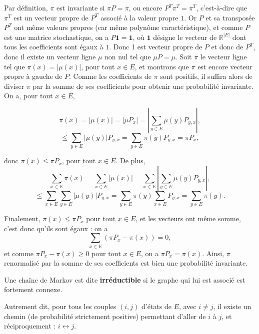 \documentclass{article}
\begin{document}
\begin{tcolorbox}[colback=white,colframe=green!80!black,title=Démonstration]
Par définition, $\pi$ est invariante si $\pi P = \pi$, ou encore $P^T \pi^T = \pi^T$, c'est-à-dire que $\pi^T$ est un vecteur propre de $P^T$ associé à la valeur propre $1$.
Or $P$ et sa transposée $P^T$ ont même valeurs propres (car même polynôme caractéristique), et comme $P$ est une matrice stochastique, on a $P \mathbf{1} = \mathbf{1}$, où $\mathbf{1}$ désigne le vecteur de $\mathbb{R}^{|E|}$ dont tous les coefficients sont égaux à $1$.
Donc 1 est vecteur propre de $P$ et donc de $P^T$, donc il existe un vecteur ligne $\mu$ non nul tel que $\mu P = \mu$. Soit $\pi$ le vecteur ligne tel que $\pi(x) = |\mu(x)|$, pour tout $x \in E$, et montrons que $\pi$ est encore vecteur propre à gauche de $P$.
Comme les coefficients de $\pi$ sont positifs, il suffira alors de diviser $\pi$ par la somme de ses coefficients pour obtenir une probabilité invariante. On a, pour tout $x \in E$,

\end{tcolorbox} \begin{tcolorbox}[colback=white,colframe=green!80!black,title=Démonstration] %

\[
\pi(x) = |\mu(x)| = |\mu P_x| = \left| \sum_{y \in E} \mu(y) P_{y,x} \right|,
\]
\[
\leq \sum_{y \in E} |\mu(y)| P_{y,x} = \sum_{y \in E} \pi(y) P_{y,x} = \pi P_x,
\]

donc $\pi(x) \leq \pi P_x$, pour tout $x \in E$. De plus,
\[
\sum_{x \in E} \pi(x) = \sum_{x \in E} |\mu(x)| = \sum_{x \in E} \left| \sum_{y \in E} \mu(y) P_{y,x} \right|,
\]
\[
\leq \sum_{x \in E} \sum_{y \in E} |\mu(y)| P_{y,x} = \sum_{y \in E} \pi(y) \sum_{x \in E} P_{y,x} = \sum_{y \in E} \pi(y).
\]

Finalement, $\pi(x) \leq \pi P_x$ pour tout $x \in E$, et les vecteurs ont même somme, c’est donc qu’ils sont égaux : on a
\[
\sum_{x \in E} (\pi P_x - \pi(x)) = 0,
\]
et comme $\pi P_x - \pi(x) \geq 0$ pour tout $x \in E$, on a $\pi P_x = \pi(x)$. Ainsi, $\pi$ renormalisé par la somme de ses coefficients est bien une probabilité invariante.
\end{tcolorbox}
  

\begin{tcolorbox}[colback=white,colframe=blue!80!black,title=Chaîne de Markov irréductible]
Une chaîne de Markov est dite \textbf{irréductible} si le graphe qui lui est associé est fortement connexe.

Autrement dit, pour tous les couples $(i, j)$ d'états de $E$, avec $i \neq j$, il existe un chemin (de probabilité strictement positive) permettant d'aller de $i$ à $j$, et réciproquement : $i \leftrightarrow j$.
\end{tcolorbox}
\end{document}
